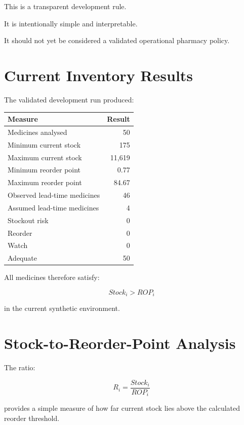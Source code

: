 \documentclass[11pt,a4paper]{article}
\begin{document}
This is a transparent development rule.

It is intentionally simple and interpretable.

It should not yet be considered a validated operational pharmacy
policy.

\section{Current Inventory Results}

The validated development run produced:

\begin{center}
\begin{tabular}{lr}
\toprule
\textbf{Measure} & \textbf{Result}\\
\midrule
Medicines analysed & 50\\
Minimum current stock & 175\\
Maximum current stock & 11,619\\
Minimum reorder point & 0.77\\
Maximum reorder point & 84.67\\
Observed lead-time medicines & 46\\
Assumed lead-time medicines & 4\\
Stockout risk & 0\\
Reorder & 0\\
Watch & 0\\
Adequate & 50\\
\bottomrule
\end{tabular}
\end{center}

All medicines therefore satisfy:

\[
Stock_i > ROP_i
\]

in the current synthetic environment.

\section{Stock-to-Reorder-Point Analysis}

The ratio:

\[
R_i=
\frac{Stock_i}{ROP_i}
\]

provides a simple measure of how far current stock lies above the
calculated reorder threshold.
\end{document}
